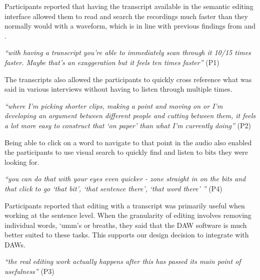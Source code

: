 Participants reported that having the transcript available in the semantic
editing interface allowed them to read and search the recordings much faster
than they normally would with a waveform, which is in line with previous findings from
\citet{Whittaker2004} and \citet{Yoon2014}.

\textit{``with having a transcript you're able to immediately scan through it
  10/15 times faster. Maybe that's an exaggeration but it feels ten times
  faster''} (P1)

The transcripts also allowed the participants to quickly cross reference what
was said in various interviews without having to listen through multiple times.

\textit{``where I'm picking shorter clips, making a point and moving on or I'm
  developing an argument between different people and cutting between them, it
  feels a lot more easy to construct that `on paper' than what I'm currently
  doing''} (P2)


Being able to click on a word to navigate to that point in the audio also
enabled the participants to use visual search to quickly find and listen to
bits they were looking for.

\textit{``you can do that with your eyes even quicker - zone straight in on the bits and that click to go  `that bit',
  `that sentence there', `that word there' ''} (P4)

Participants reported that editing with a transcript was primarily useful when working at the sentence level. When the
granularity of editing involves removing individual words, `umm's or breaths, they said that the DAW software is much
better suited to these tasks. This supports our design decision to integrate with DAWs.

\textit{``the real editing work actually happens after this has passed its main
  point of usefulness''} (P3)



